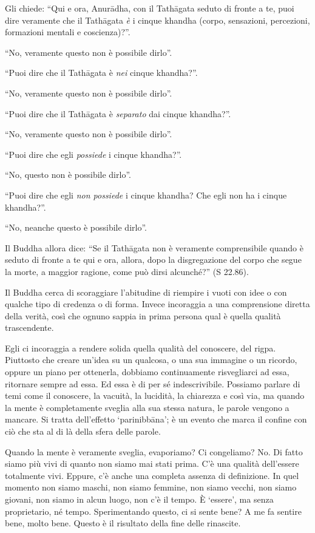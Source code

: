 Gli chiede: ``Qui e ora, Anurādha, con il Tathāgata seduto di fronte a te, puoi dire veramente che il Tathāgata \textit{è }i cinque khandha (corpo, sensazioni, percezioni, formazioni mentali e coscienza)?''.

``No, veramente questo non è possibile dirlo''.

``Puoi dire che il Tathāgata è \textit{nei} cinque khandha?''.

``No, veramente questo non è possibile dirlo''.

``Puoi dire che il Tathāgata è \textit{separato} dai cinque khandha?''.

``No, veramente questo non è possibile dirlo''.

``Puoi dire che egli \textit{possiede} i cinque khandha?''.

``No, questo non è possibile dirlo''.

``Puoi dire che egli \textit{non possiede }i cinque khandha? Che egli non ha i cinque khandha?''.

``No, neanche questo è possibile dirlo''.

Il Buddha allora dice: ``Se il Tathāgata non è veramente comprensibile quando è seduto di fronte a te qui e ora, allora, dopo la disgregazione del corpo che segue la morte, a maggior ragione, come può dirsi alcunché?'' (S 22.86).

Il Buddha cerca di scoraggiare l'abitudine di riempire i vuoti con idee o con qualche tipo di credenza o di forma. Invece incoraggia a una comprensione diretta della verità, così che ognuno sappia in prima persona qual è quella qualità trascendente.

Egli ci incoraggia a rendere solida quella qualità del conoscere, del rigpa. Piuttosto che creare un'idea su un qualcosa, o una sua immagine o un ricordo, oppure un piano per ottenerla, dobbiamo continuamente risvegliarci ad essa, ritornare sempre ad essa. Ed essa è di per sé indescrivibile. Possiamo parlare di temi come il conoscere, la vacuità, la lucidità, la chiarezza e così via, ma quando la mente è completamente sveglia alla sua stessa natura, le parole vengono a mancare. Si tratta dell'effetto `parinibbāna'; è un evento che marca il confine con ciò che sta al di là della sfera delle parole. 

Quando la mente è veramente sveglia, evaporiamo? Ci congeliamo? No. Di fatto siamo più vivi di quanto non siamo mai stati prima. C'è una qualità dell'essere totalmente vivi. Eppure, c'è anche una completa assenza di definizione. In quel momento non siamo maschi, non siamo femmine, non siamo vecchi, non siamo giovani, non siamo in alcun luogo, non c'è il tempo. È `essere', ma senza proprietario, né tempo. Sperimentando questo, ci si sente bene? A me fa sentire bene, molto bene. Questo è il risultato della fine delle rinascite.

